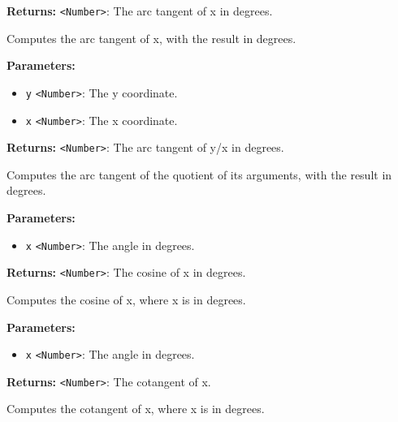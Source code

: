 \documentclass[12pt,a4paper]{article}
\begin{document}
\noindent \textbf{Returns:} \texttt{<Number>}: The arc tangent of x in degrees.

\noindent Computes the arc tangent of x, with the result in degrees.

\vspace{5mm}
\noindent {}


\noindent \textbf{Parameters:}
\begin{itemize}
  \item \texttt{y} \texttt{<Number>}: The y coordinate.
  \item \texttt{x} \texttt{<Number>}: The x coordinate.
\end{itemize}

\noindent \textbf{Returns:} \texttt{<Number>}: The arc tangent of y/x in degrees.

\noindent Computes the arc tangent of the quotient of its arguments, with the result in degrees.

\vspace{5mm}
\noindent {}


\noindent \textbf{Parameters:}
\begin{itemize}
  \item \texttt{x} \texttt{<Number>}: The angle in degrees.
\end{itemize}

\noindent \textbf{Returns:} \texttt{<Number>}: The cosine of x in degrees.

\noindent Computes the cosine of x, where x is in degrees.

\vspace{5mm}
\noindent {}


\noindent \textbf{Parameters:}
\begin{itemize}
  \item \texttt{x} \texttt{<Number>}: The angle in degrees.
\end{itemize}

\noindent \textbf{Returns:} \texttt{<Number>}: The cotangent of x.

\noindent Computes the cotangent of x, where x is in degrees.
\end{document}
